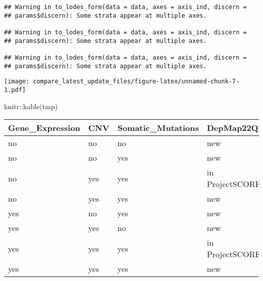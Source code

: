 \documentclass[
]{article}
\newenvironment{Shaded}{\begin{snugshade}}{\end{snugshade}}
\newcommand{\FunctionTok}[1]{\textcolor[rgb]{0.00,0.00,0.00}{#1}}
\newcommand{\NormalTok}[1]{#1}
\newcommand{\SpecialCharTok}[1]{\textcolor[rgb]{0.00,0.00,0.00}{#1}}
\begin{document}
\begin{verbatim}
## Warning in to_lodes_form(data = data, axes = axis_ind, discern =
## params$discern): Some strata appear at multiple axes.

## Warning in to_lodes_form(data = data, axes = axis_ind, discern =
## params$discern): Some strata appear at multiple axes.

## Warning in to_lodes_form(data = data, axes = axis_ind, discern =
## params$discern): Some strata appear at multiple axes.
\end{verbatim}

\texttt{[image: compare\_latest\_update\_files/figure-latex/unnamed-chunk-7-1.pdf]}

\begin{Shaded}
\begin{Highlighting}[]
\NormalTok{knitr}\SpecialCharTok{::}\FunctionTok{kable}\NormalTok{(tmp)}
\end{Highlighting}
\end{Shaded}

\begin{longtable}[]{@{}llllr@{}}
\toprule
Gene\_Expression & CNV & Somatic\_Mutations & DepMap22Q2 & Freq \\
\midrule
\endhead
no & no & no & new & 3 \\
no & no & yes & new & 1 \\
no & yes & yes & in ProjectSCORE & 73 \\
no & yes & yes & new & 4 \\
yes & no & yes & new & 5 \\
yes & yes & no & new & 1 \\
yes & yes & yes & in ProjectSCORE & 788 \\
yes & yes & yes & new & 211 \\
\bottomrule
\end{longtable}
\end{document}
